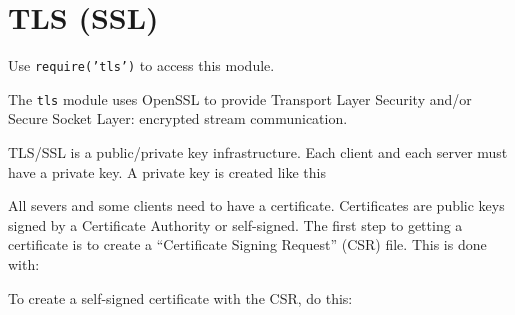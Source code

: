 \section{TLS (SSL)}

\begin{Shaded}
\begin{Highlighting}[]
\NormalTok{: } 
\end{Highlighting}
\end{Shaded}

Use \texttt{require('tls')} to access this module.

The \texttt{tls} module uses OpenSSL to provide Transport Layer Security
and/or Secure Socket Layer: encrypted stream communication.

TLS/SSL is a public/private key infrastructure. Each client and each
server must have a private key. A private key is created like this

\begin{Shaded}
\begin{Highlighting}[]
 
\end{Highlighting}
\end{Shaded}

All severs and some clients need to have a certificate. Certificates are
public keys signed by a Certificate Authority or self-signed. The first
step to getting a certificate is to create a ``Certificate Signing
Request'' (CSR) file. This is done with:

\begin{Shaded}
\begin{Highlighting}[]
  
\end{Highlighting}
\end{Shaded}

To create a self-signed certificate with the CSR, do this:

\begin{Shaded}
\begin{Highlighting}[]
   
\end{Highlighting}
\end{Shaded}

